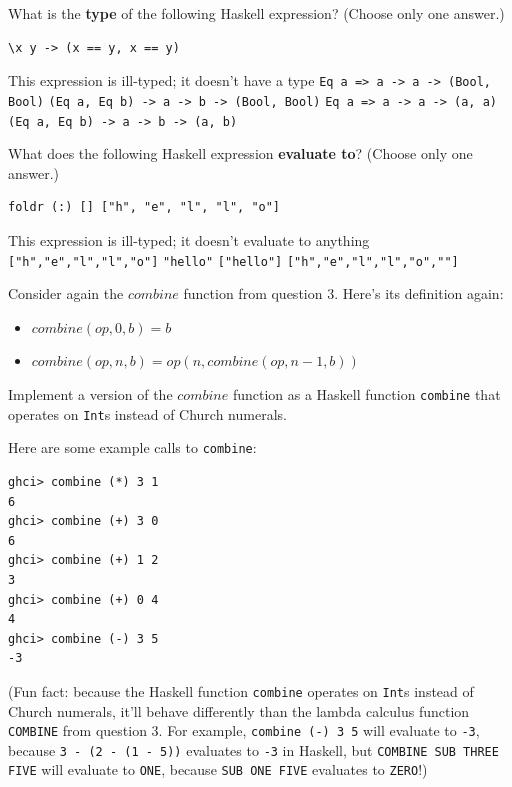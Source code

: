 \documentclass[addpoints]{exam}
\begin{document}
\begin{questions}
\question[3] What is the \textbf{type} of the following Haskell expression?  (Choose only one answer.)

\begin{verbatim}
\x y -> (x == y, x == y)
\end{verbatim}

\begin{checkboxes}
  \choice This expression is ill-typed; it doesn't have a type
  \CorrectChoice \verb|Eq a => a -> a -> (Bool, Bool)|
  \choice \verb|(Eq a, Eq b) -> a -> b -> (Bool, Bool)|
  \choice \verb|Eq a => a -> a -> (a, a)|
  \choice \verb|(Eq a, Eq b) -> a -> b -> (a, b)|
\end{checkboxes}

\question[3] What does the following Haskell expression \textbf{evaluate to}? (Choose only one answer.)

\begin{verbatim}
foldr (:) [] ["h", "e", "l", "l", "o"]
\end{verbatim}

\begin{checkboxes}
  \choice This expression is ill-typed; it doesn't evaluate to anything
  \CorrectChoice \verb|["h","e","l","l","o"]|
  \choice \verb|"hello"|
  \choice \verb|["hello"]|
  \choice \verb|["h","e","l","l","o",""]|
\end{checkboxes}

\newpage

\question[5] Consider again the $\mathit{combine}$ function from question 3.  Here's its definition again:

\begin{itemize}
\item $\mathit{combine}(\mathit{op}, 0, b) = b$
\item $\mathit{combine}(\mathit{op}, n, b) = \mathit{op}(n, \mathit{combine}(\mathit{op}, n-1, b))$
\end{itemize}

Implement a version of the $\mathit{combine}$ function as a Haskell function \verb|combine| that operates on \verb|Int|s instead of Church numerals.

Here are some example calls to \verb|combine|:

\begin{verbatim}
ghci> combine (*) 3 1
6
ghci> combine (+) 3 0
6
ghci> combine (+) 1 2
3
ghci> combine (+) 0 4
4
ghci> combine (-) 3 5
-3
\end{verbatim}

(Fun fact: because the Haskell function \verb|combine| operates on \verb|Int|s instead of Church numerals, it'll behave differently than the lambda calculus function \verb|COMBINE| from question 3.  For example, \verb|combine (-) 3 5| will evaluate to \verb|-3|, because \verb|3 - (2 - (1 - 5))| evaluates to \verb|-3| in Haskell, but \verb|COMBINE SUB THREE FIVE| will evaluate to \verb|ONE|, because \verb|SUB ONE FIVE| evaluates to \verb|ZERO|!)


\end{questions}
\end{document}
